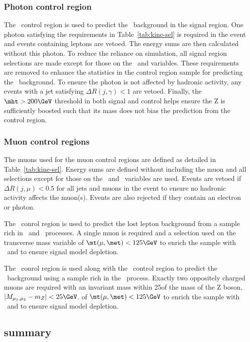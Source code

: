 \subsubsection{Photon control region}
The \gj~control region is used to predict the \znunu~background in the signal region.
One photon satisfying the requirements in Table~\ref{tab:kine-sel} is required in the 
event and events containing leptons are vetoed. The energy sums are then calculated without this photon. To reduce the reliance on simulation, 
all signal region selections are made except for those on the \bdphi~and \alphat variables.
These requirements are removed to enhance the statistics in the control region sample 
for predicting the \znunu~background. To ensure the photon is not affected by hadronic
activity, any events with a jet satisfying $\Delta R(j,\gamma) < 1$ are vetoed. Finally,
the $\mht > 200\GeV$ threshold in both signal and control helps ensure the Z is sufficiently
boosted such that its mass does not bias the prediction from the \gj control region. 
\subsubsection{Muon control regions}
The muons used for the muon control regions are defined as detailed in
Table~\ref{tab:kine-sel}. Energy sums are defined without including the muon 
and all selections except for those on the \bdphi~and \alphat~variables are used.
Events are vetoed if $\Delta R(j,\mu) < 0.5$ for all jets and muons in the event to
ensure no hadronic activity affects the muon(s). Events are also rejected if they 
contain an electron or photon.

The \mj~conrol region is used to predict the lost lepton background from 
a sample rich in \wj~and \ttbar~processes. A single muon is required and a selection used on the transverse mass variable
of $\mt(\mu,\met) < 125\GeV$ to enrich the sample with \wj~and to ensure signal model depletion.

The \mmj~conrol region is used along with the \gj~control region to predict the \znunu~background
using a sample rich in the \zmmj~process. Exactly two oppositely charged muons are required with
an invariant mass within 25\GeV of the mass of the Z boson, $|M_{\mu_1,\mu_2} - m_Z| < 25\GeV$.
of $\mt(\mu,\met) < 125\GeV$ to enrich the sample with \wj~and to ensure signal model depletion.

\subsection{summary}


